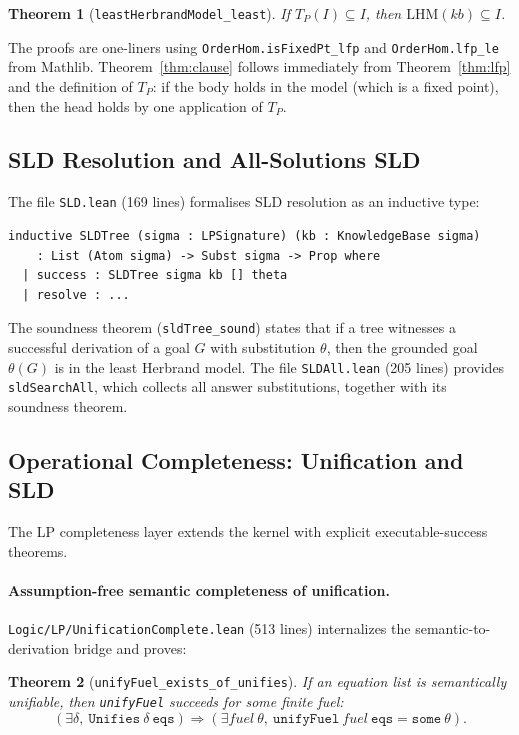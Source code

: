 \documentclass[]{article}
\newtheorem{theorem}{Theorem}
\newcommand{\code}[1]{\texttt{#1}}
\begin{document}
\begin{theorem}[\code{leastHerbrandModel\_least}]
\label{thm:least}
If $T_P(I) \subseteq I$, then $\mathrm{LHM}(kb) \subseteq I$.
\end{theorem}

The proofs are one-liners using \code{OrderHom.isFixedPt\_lfp} and \code{OrderHom.lfp\_le}
from Mathlib.  Theorem~\ref{thm:clause} follows immediately from
Theorem~\ref{thm:lfp} and the definition of $T_P$: if the body holds in
the model (which is a fixed point), then the head holds by one application of $T_P$.

\subsection{SLD Resolution and All-Solutions SLD}

The file \code{SLD.lean} (169 lines) formalises SLD resolution as an inductive type:

\begin{lstlisting}[language=lean]
inductive SLDTree (sigma : LPSignature) (kb : KnowledgeBase sigma)
    : List (Atom sigma) -> Subst sigma -> Prop where
  | success : SLDTree sigma kb [] theta
  | resolve : ...
\end{lstlisting}

The soundness theorem (\code{sldTree\_sound}) states that if a tree witnesses a
successful derivation of a goal $G$ with substitution $\theta$, then the grounded
goal $\theta(G)$ is in the least Herbrand model.  The file \code{SLDAll.lean}
(205 lines) provides \code{sldSearchAll}, which collects all answer substitutions,
together with its soundness theorem.

\subsection{Operational Completeness: Unification and SLD}

The LP completeness layer extends the kernel with explicit executable-success
theorems.

\paragraph{Assumption-free semantic completeness of unification.}
\code{Logic/LP/UnificationComplete.lean} (513 lines) internalizes the
semantic-to-derivation bridge and proves:

\begin{theorem}[\code{unifyFuel\_exists\_of\_unifies}]
\label{thm:unifycomplete}
If an equation list is semantically unifiable, then \code{unifyFuel} succeeds
for some finite fuel:
\[
  (\exists \delta,\ \code{Unifies}\ \delta\ \code{eqs}) \Rightarrow
  (\exists fuel\ \theta,\ \code{unifyFuel}\ fuel\ \code{eqs} = \code{some}\ \theta).
\]
\end{theorem}
\end{document}
